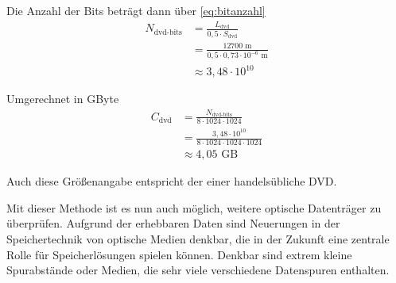 \documentclass[9pt,twocolumn,twoside]{pnas-new}
\begin{document}
Die Anzahl der Bits beträgt dann über \eqref{eq:bitanzahl}
\begin{align*}
N_{\mbox{dvd-bits}} &=  \frac{L_{\mbox{dvd}}}{0,5\cdot S_{\mbox{dvd}}}\\
&= \frac{12700\mbox{ m}}{0,5\cdot 0,73\cdot10^{-6}\mbox{ m}}\\
&\approx 3,48\cdot 10^{10}
\end{align*}

Umgerechnet in GByte
\begin{align*}
C_{\mbox{dvd}} &= \frac{N_{\mbox{dvd-bits}}}{8\cdot1024\cdot1024}\\
&= \frac{3,48\cdot10^{10}}{8\cdot1024\cdot1024\cdot1024}\\
&\approx 4,05\mbox{ GB}
\end{align*}

Auch diese Größenangabe entspricht der einer handelsübliche DVD.


Mit dieser Methode ist es nun auch möglich, weitere optische Datenträger zu überprüfen.
Aufgrund der erhebbaren Daten sind Neuerungen in der Speichertechnik von optische Medien denkbar, die in der Zukunft eine zentrale Rolle für Speicherlösungen spielen können.
Denkbar sind extrem kleine Spurabstände oder Medien, die sehr viele verschiedene Datenspuren enthalten.




\end{document}

